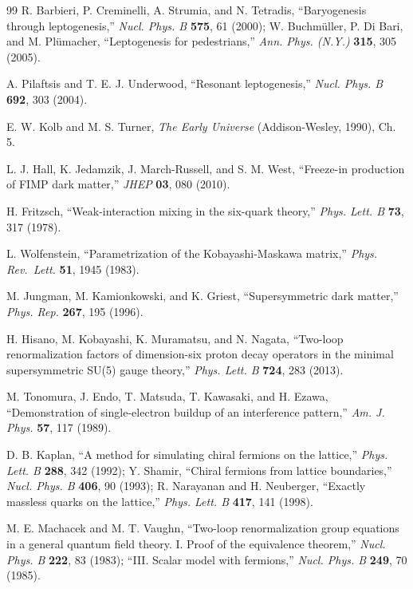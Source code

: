 \documentclass[aps,prd,twocolumn,amsmath,amssymb,superscriptaddress,nofootinbib,floatfix]{revtex4-2}
\begin{document}
\begin{thebibliography}{99}
 R. Barbieri, P. Creminelli, A. Strumia, and N. Tetradis, ``Baryogenesis
through leptogenesis,'' \emph{Nucl. Phys. B} \textbf{575}, 61 (2000); W.
Buchmüller, P. Di Bari, and M. Plümacher, ``Leptogenesis for
pedestrians,'' \emph{Ann. Phys. (N.Y.)} \textbf{315}, 305 (2005).

 A. Pilaftsis and T. E. J. Underwood, ``Resonant leptogenesis,''
\emph{Nucl. Phys. B} \textbf{692}, 303 (2004).

 E. W. Kolb and M. S. Turner, \emph{The Early Universe} (Addison-Wesley,
1990), Ch. 5.

 L. J. Hall, K. Jedamzik, J. March-Russell, and S. M. West, ``Freeze-in
production of FIMP dark matter,'' \emph{JHEP} \textbf{03}, 080 (2010).

 H. Fritzsch, ``Weak-interaction mixing in the six-quark theory,''
\emph{Phys. Lett. B} \textbf{73}, 317 (1978).

 L. Wolfenstein, ``Parametrization of the Kobayashi-Maskawa matrix,''
\emph{Phys. Rev.~Lett.} \textbf{51}, 1945 (1983).

 M. Jungman, M. Kamionkowski, and K. Griest, ``Supersymmetric dark
matter,'' \emph{Phys. Rep.} \textbf{267}, 195 (1996).

 H. Hisano, M. Kobayashi, K. Muramatsu, and N. Nagata, ``Two-loop
renormalization factors of dimension-six proton decay operators in the
minimal supersymmetric SU(5) gauge theory,'' \emph{Phys. Lett. B}
\textbf{724}, 283 (2013).

 M. Tonomura, J. Endo, T. Matsuda, T. Kawasaki, and H. Ezawa,
``Demonstration of single-electron buildup of an interference pattern,''
\emph{Am. J. Phys.} \textbf{57}, 117 (1989).

 D. B. Kaplan, ``A method for simulating chiral fermions on the
lattice,'' \emph{Phys. Lett. B} \textbf{288}, 342 (1992); Y. Shamir,
``Chiral fermions from lattice boundaries,'' \emph{Nucl. Phys. B}
\textbf{406}, 90 (1993); R. Narayanan and H. Neuberger, ``Exactly
massless quarks on the lattice,'' \emph{Phys. Lett. B} \textbf{417}, 141
(1998).

 M. E. Machacek and M. T. Vaughn, ``Two-loop renormalization group
equations in a general quantum field theory. I. Proof of the equivalence
theorem,'' \emph{Nucl. Phys. B} \textbf{222}, 83 (1983); ``III. Scalar
model with fermions,'' \emph{Nucl. Phys. B} \textbf{249}, 70 (1985).


\end{thebibliography}
\end{document}
